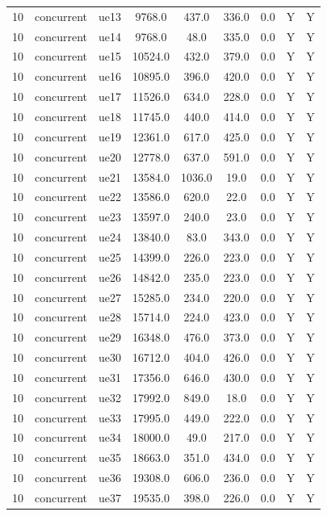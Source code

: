 \begin{table}[ht]
\begin{tabular}{|c|c|c|c|c|c|c|c|c|}
10 & concurrent & ue13 & 9768.0 & 437.0 & 336.0 & 0.0 & Y & Y \\
10 & concurrent & ue14 & 9768.0 & 48.0 & 335.0 & 0.0 & Y & Y \\
10 & concurrent & ue15 & 10524.0 & 432.0 & 379.0 & 0.0 & Y & Y \\
10 & concurrent & ue16 & 10895.0 & 396.0 & 420.0 & 0.0 & Y & Y \\
10 & concurrent & ue17 & 11526.0 & 634.0 & 228.0 & 0.0 & Y & Y \\
10 & concurrent & ue18 & 11745.0 & 440.0 & 414.0 & 0.0 & Y & Y \\
10 & concurrent & ue19 & 12361.0 & 617.0 & 425.0 & 0.0 & Y & Y \\
10 & concurrent & ue20 & 12778.0 & 637.0 & 591.0 & 0.0 & Y & Y \\
10 & concurrent & ue21 & 13584.0 & 1036.0 & 19.0 & 0.0 & Y & Y \\
10 & concurrent & ue22 & 13586.0 & 620.0 & 22.0 & 0.0 & Y & Y \\
10 & concurrent & ue23 & 13597.0 & 240.0 & 23.0 & 0.0 & Y & Y \\
10 & concurrent & ue24 & 13840.0 & 83.0 & 343.0 & 0.0 & Y & Y \\
10 & concurrent & ue25 & 14399.0 & 226.0 & 223.0 & 0.0 & Y & Y \\
10 & concurrent & ue26 & 14842.0 & 235.0 & 223.0 & 0.0 & Y & Y \\
10 & concurrent & ue27 & 15285.0 & 234.0 & 220.0 & 0.0 & Y & Y \\
10 & concurrent & ue28 & 15714.0 & 224.0 & 423.0 & 0.0 & Y & Y \\
10 & concurrent & ue29 & 16348.0 & 476.0 & 373.0 & 0.0 & Y & Y \\
10 & concurrent & ue30 & 16712.0 & 404.0 & 426.0 & 0.0 & Y & Y \\
10 & concurrent & ue31 & 17356.0 & 646.0 & 430.0 & 0.0 & Y & Y \\
10 & concurrent & ue32 & 17992.0 & 849.0 & 18.0 & 0.0 & Y & Y \\
10 & concurrent & ue33 & 17995.0 & 449.0 & 222.0 & 0.0 & Y & Y \\
10 & concurrent & ue34 & 18000.0 & 49.0 & 217.0 & 0.0 & Y & Y \\
10 & concurrent & ue35 & 18663.0 & 351.0 & 434.0 & 0.0 & Y & Y \\
10 & concurrent & ue36 & 19308.0 & 606.0 & 236.0 & 0.0 & Y & Y \\
10 & concurrent & ue37 & 19535.0 & 398.0 & 226.0 & 0.0 & Y & Y \\

\end{tabular}
\end{table}
